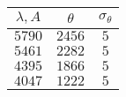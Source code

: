 \begin{tabular}{| c | c | c |}
\hline
$\lambda, A$ & $\theta$ & $\sigma_{\theta}$\\
\hline
$5790$ & $2456$ & $5$\\
\hline
$5461$ & $2282$ & $5$\\
\hline
$4395$ & $1866$ & $5$\\
\hline
$4047$ & $1222$ & $5$\\
\hline
\end{tabular}
